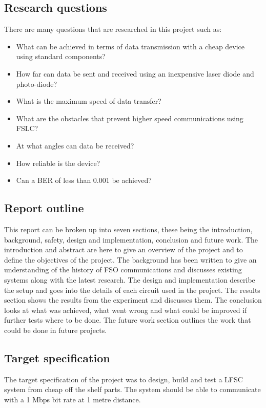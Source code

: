 \documentclass[conference]{IEEEtran}
\begin{document}
\subsection{Research questions}
There are many questions that are researched in this project such as:
\\
\begin{itemize}
\item What can be achieved in terms of data transmission with a cheap device using standard components? 
\item How far can data be sent and received using an inexpensive laser diode and photo-diode?
\item What is the maximum speed of data transfer? 
\item What are the obstacles that prevent higher speed communications using FSLC?
\item At what angles can data be received? 
\item How reliable is the device? 
\item Can a BER of less than 0.001 be achieved? 

\end{itemize}

\subsection{Report outline}

This report can be broken up into seven sections, these being the introduction, background, safety, design and implementation, conclusion and future work. The introduction and abstract are here to give an overview of the project and to define the objectives of the project. The background has been written to give an understanding of the history of FSO communications and discusses existing systems along with the latest research. The design and implementation describe the setup and goes into the details of each circuit used in the project. The results section shows the results from the experiment and discusses them. The conclusion looks at what was achieved, what went wrong and what could be improved if further tests where to be done. The future work section outlines the work that could be done in future projects.

\subsection{Target specification}

The target specification of the project was to design, build and test a LFSC system from cheap off the shelf parts. The system should be able to communicate with a 1 Mbps bit rate at 1 metre distance. 
\end{document}

